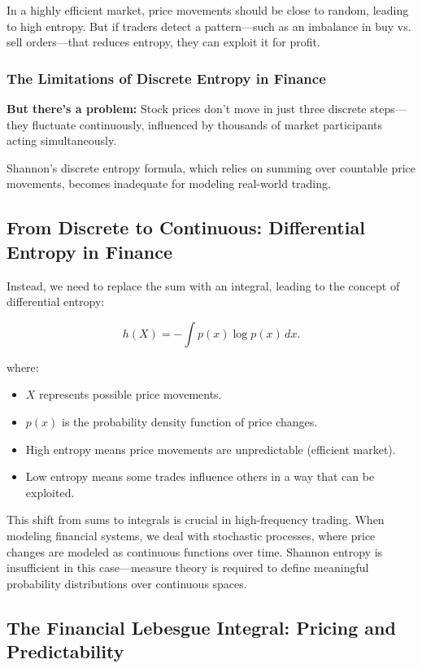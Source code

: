In a highly efficient market, price movements should be close to random, leading to high entropy. But if traders detect a pattern—such as an imbalance in buy vs. sell orders—that reduces entropy, they can exploit it for profit.

\subsubsection*{The Limitations of Discrete Entropy in Finance}

\textbf{But there’s a problem:} Stock prices don’t move in just three discrete steps—they fluctuate continuously, influenced by thousands of market participants acting simultaneously.

 Shannon’s discrete entropy formula, which relies on summing over countable price movements, becomes inadequate for modeling real-world trading.

\subsection{From Discrete to Continuous: Differential Entropy in Finance}

Instead, we need to replace the sum with an integral, leading to the concept of differential entropy:

\[
h(X) = -\int p(x) \log p(x) \, dx.
\]

where:
\begin{itemize}
    \item \( X \) represents possible price movements.
    \item \( p(x) \) is the probability density function of price changes.
    \item High entropy means price movements are unpredictable (efficient market).
    \item Low entropy means some trades influence others in a way that can be exploited.
\end{itemize}

This shift from sums to integrals is crucial in high-frequency trading. When modeling financial systems, we deal with stochastic processes, where price changes are modeled as continuous functions over time. Shannon entropy is insufficient in this case—measure theory is required to define meaningful probability distributions over continuous spaces.

\subsection{The Financial Lebesgue Integral: Pricing and Predictability}

